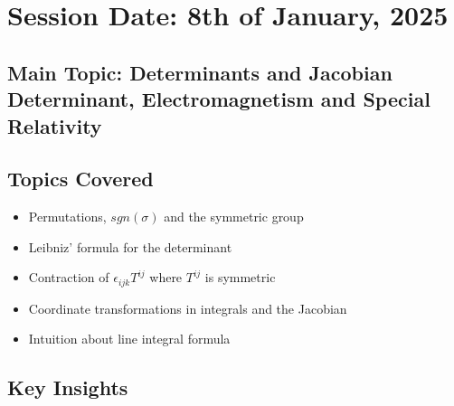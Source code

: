 \section{Session Date: 8th of January, 2025}
\subsection*{Main Topic: Determinants and Jacobian Determinant, Electromagnetism and Special Relativity}
\subsection*{Topics Covered}
\begin{itemize}
    \item Permutations, \(sgn(\sigma)\) and the symmetric group
    \item Leibniz' formula for the determinant
    \item Contraction of \(\epsilon_{ijk} T^{ij} \) where \(T^{ij}\) is symmetric
    \item Coordinate transformations in integrals and the Jacobian 
    \item Intuition about line integral formula
\end{itemize}

\subsection*{Key Insights}
